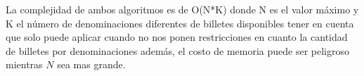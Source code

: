 La complejidad de ambos algoritmos es de O(N*K) donde N es el valor máximo y K el número de denominaciones diferentes de billetes disponibles tener en cuenta que solo puede aplicar cuando no nos ponen restricciones en cuanto la cantidad de billetes por denominaciones además, el costo de memoria puede ser peligroso mientras $N$ sea mas grande.